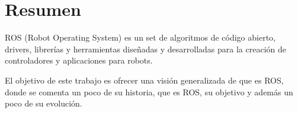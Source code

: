 

\chapter*{Resumen}



\todo[inline]{}
	
ROS (Robot Operating System) es un set de algoritmos de código abierto, drivers, librerías y herramientas diseñadas y desarrolladas para la creación de controladores y aplicaciones para robots.

El objetivo de este trabajo es ofrecer una visión generalizada de que es ROS, donde se comenta un poco de su historia, que es ROS, su objetivo y además un poco de su evolución.


  




